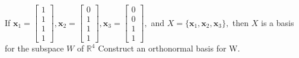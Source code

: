 \documentclass{report}
\begin{document}
\begin{example}
	If $\mathbf{x}_1 = \begin{bmatrix} 1 \\ 1 \\ 1 \\ 1 \end{bmatrix}, \mathbf{x}_2 = \begin{bmatrix} 0 \\ 1 \\ 1 \\ 1 \end{bmatrix}, \mathbf{x}_3 = \begin{bmatrix} 0 \\ 0 \\ 1 \\ 1 \end{bmatrix},$ and $X = \{\mathbf{x}_1, \mathbf{x}_2, \mathbf{x}_3\},$ then $X$ is a basis for the subspace $W$ of $\mathbb{R}^4$ Construct an orthonormal basis for W.
\end{example}
\end{document}
